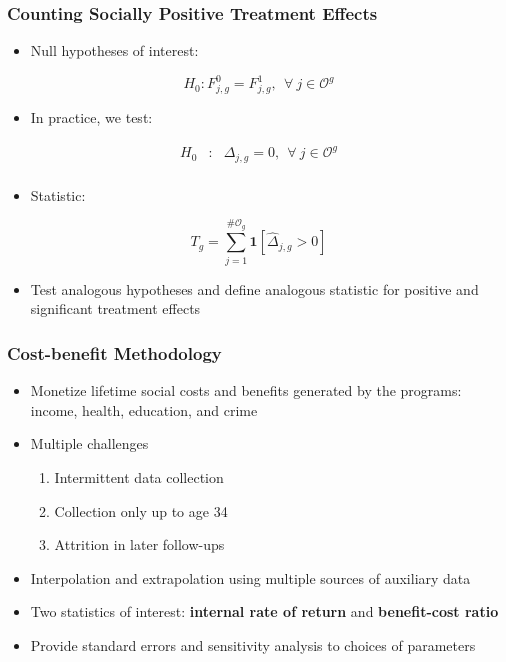 \documentclass[static]{JJH-Beamer}
\begin{document}
\begin{frame}
\frametitle{Counting Socially Positive Treatment Effects}

\begin{itemize}
	\item Null hypotheses of interest: 
\end{itemize}
		\begin{equation}
			H_{0}: F_{j,g}^0 = F_{j,g}^1, \ \ \forall \ j \in \mathcal{O}^g 
		\end{equation}

\begin{itemize}
	\item In practice, we test: 
\end{itemize}
		\begin{eqnarray}
		H_{0} &:&  \Delta_{j,g} = 0, \ \ \forall \ j \in \mathcal{O}^g  \nonumber \\
		\end{eqnarray}

\begin{itemize}	
		\item Statistic:
\end{itemize}
	\begin{equation}
		T_g = \sum _{j=1}^{\# \mathcal{O}_g} \mathbf{1} \left[ \widehat{\Delta}_{j,g} > 0\right] \label{eq:count1}
	\end{equation}

\begin{itemize}	
		\item Test analogous hypotheses and define analogous statistic for positive and significant treatment effects
\end{itemize}
	
\end{frame}


\begin{frame}
\frametitle{Cost-benefit Methodology}
\begin{itemize}
	\item Monetize lifetime social costs and benefits generated by the programs: income, health, education, and crime
	\item Multiple challenges
		\begin{enumerate}
			\item Intermittent data collection 
			\item Collection only up to age 34
			\item Attrition in later follow-ups
		\end{enumerate}
	\item Interpolation and extrapolation using multiple sources of auxiliary data
	\item Two statistics of interest: \textbf{internal rate of return} and \textbf{benefit-cost ratio}
	\item Provide standard errors and sensitivity analysis to choices of parameters
\end{itemize}
\end{frame}
\end{document}
